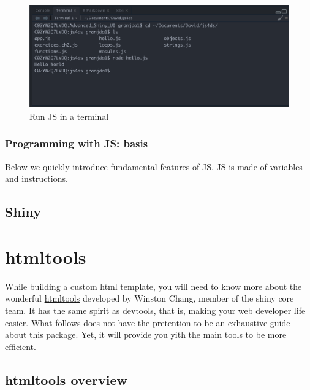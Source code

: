 \documentclass[]{book}
\begin{document}
\begin{figure}
\includegraphics[width=26.75in]{images/survival-kit/script-rstudio} \caption{Run JS in a terminal}\label{fig:script-rstudio}
\end{figure}

\hypertarget{programming-with-js-basis}{%
\section{Programming with JS: basis}\label{programming-with-js-basis}}

Below we quickly introduce fundamental features of JS. JS is made of variables and instructions.

\hypertarget{survival-kit-shiny}{%
\chapter{Shiny}\label{survival-kit-shiny}}

\hypertarget{part-htmltools}{%
\part*{htmltools}\label{part-htmltools}}

While building a custom html template, you will need to know more about the wonderful \href{https://github.com/rstudio/htmltools}{htmltools} developed by Winston Chang, member of the shiny core team. It has the same spirit as devtools, that is, making your web developer life easier. What follows does not have the pretention to be an exhaustive guide about this package. Yet, it will provide you yith the main tools to be more efficient.

\hypertarget{htmltools-overview}{%
\chapter{htmltools overview}\label{htmltools-overview}}
\end{document}
